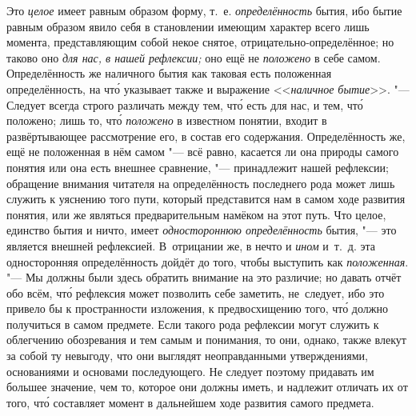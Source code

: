 \label{bkm:bm25a}Это {\em целое} имеет равным образом форму, т.~е.
{\em определённость} бытия, ибо бытие равным образом явило себя в становлении
имеющим характер всего лишь момента, представляющим собой некое снятое,
отрицательно-определённое; но таково
оно {\em для нас, в нашей рефлексии;} оно ещё не {\em положено} в себе самом.
Определённость же наличного бытия как таковая есть положенная определённость,
на чт\'{о} указывает также и выражение <<{\em наличное бытие}>>. "--- Следует
всегда строго различать между тем, чт\'{о} есть для нас, и тем, чт\'{о}
положено; лишь то, чт\'{о} {\em положено} в известном понятии, входит в
развёртывающее рассмотрение его, в состав его содержания. Определённость же,
ещё не положенная в нём самом "--- всё равно, касается ли она природы самого
понятия или она есть внешнее сравнение, "--- принадлежит нашей рефлексии;
обращение внимания читателя на определённость последнего рода может лишь
служить к уяснению того пути, который представится нам в самом ходе развития
понятия, или же являться предварительным намёком на этот путь. Что целое,
единство бытия и ничто, имеет {\em одностороннюю определённость} бытия, "---
это является внешней рефлексией. В~отрицании же, в нечто и {\em ином} и~т.~д.
эта односторонняя определённость дойдёт до того, чтобы выступить как
{\em положенная}. "--- Мы должны были здесь обратить внимание на это различие;
но давать отчёт обо всём, чт\'{о} рефлексия может позволить себе заметить,
не~следует, ибо это привело бы к пространности изложения, к предвосхищению
того, чт\'{о} должно получиться в самом предмете. Если такого рода рефлексии
могут служить к облегчению обозревания и тем самым и понимания, то они, однако,
также влекут за собой ту невыгоду, что они выглядят неоправданными
утверждениями, основаниями и основами последующего. Не следует поэтому
придавать им большее значение, чем то, которое они должны иметь, и надлежит
отличать их от того, чт\'{о} составляет момент в дальнейшем ходе развития
самого предмета.

